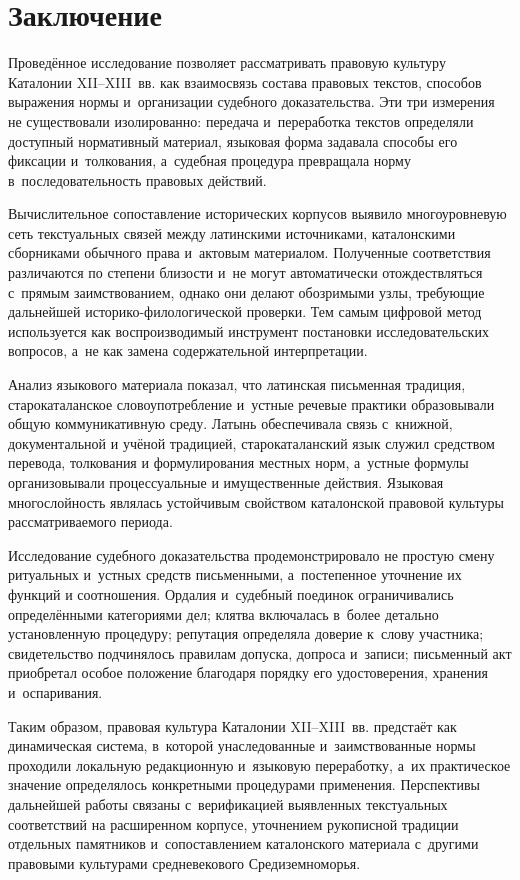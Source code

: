 \chapter*{Заключение}

Проведённое исследование позволяет рассматривать правовую культуру Каталонии
XII--XIII~вв. как взаимосвязь состава правовых текстов, способов выражения нормы
и~организации судебного доказательства. Эти три измерения не существовали
изолированно: передача и~переработка текстов определяли доступный нормативный
материал, языковая форма задавала способы его фиксации и~толкования, а~судебная
процедура превращала норму в~последовательность правовых действий.

Вычислительное сопоставление исторических корпусов выявило многоуровневую сеть
текстуальных связей между латинскими источниками, каталонскими сборниками
обычного права и~актовым материалом. Полученные соответствия различаются по
степени близости и~не могут автоматически отождествляться с~прямым
заимствованием, однако они делают обозримыми узлы, требующие дальнейшей
историко-филологической проверки. Тем самым цифровой метод используется как
воспроизводимый инструмент постановки исследовательских вопросов, а~не как
замена содержательной интерпретации.

Анализ языкового материала показал, что латинская письменная традиция,
старокаталанское словоупотребление и~устные речевые практики образовывали общую
коммуникативную среду. Латынь обеспечивала связь с~книжной, документальной и
учёной традицией, старокаталанский язык служил средством перевода, толкования и
формулирования местных норм, а~устные формулы организовывали процессуальные и
имущественные действия. Языковая многослойность являлась устойчивым свойством
каталонской правовой культуры рассматриваемого периода.

Исследование судебного доказательства продемонстрировало не простую смену
ритуальных и~устных средств письменными, а~постепенное уточнение их функций и
соотношения. Ордалия и~судебный поединок ограничивались определёнными категориями
дел; клятва включалась в~более детально установленную процедуру; репутация
определяла доверие к~слову участника; свидетельство подчинялось правилам допуска,
допроса и~записи; письменный акт приобретал особое положение благодаря порядку
его удостоверения, хранения и~оспаривания.

Таким образом, правовая культура Каталонии XII--XIII~вв. предстаёт как
динамическая система, в~которой унаследованные и~заимствованные нормы проходили
локальную редакционную и~языковую переработку, а~их практическое значение
определялось конкретными процедурами применения. Перспективы дальнейшей работы
связаны с~верификацией выявленных текстуальных соответствий на расширенном
корпусе, уточнением рукописной традиции отдельных памятников и~сопоставлением
каталонского материала с~другими правовыми культурами средневекового
Средиземноморья.
